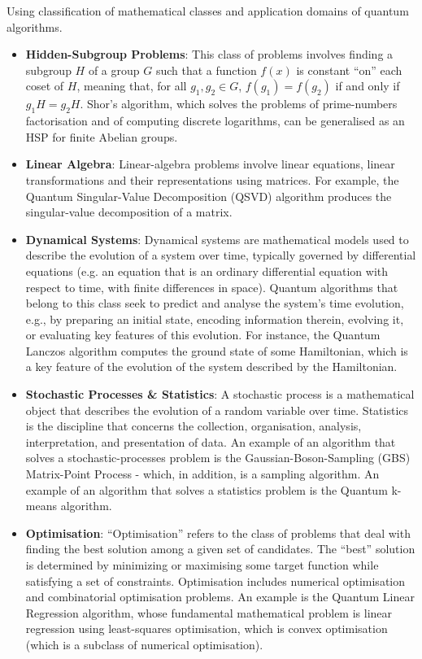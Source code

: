 Using \citeauthor{Arnault:2024} \citeyear{Arnault:2024} \cite{Arnault:2024} classification of mathematical classes
and application domains of quantum algorithms.

\begin{itemize}
\item \textbf{Hidden-Subgroup Problems}: This class of problems involves finding a subgroup $H$ of a group $G$ such
  that a function $f(x)$ is constant “on” each coset of $H$, meaning that, for all $g_1, g_2 \in G$, $f(g_1) = f(g_2)$
  if and only if $g_1H = g_2H$.
  Shor’s algorithm, which solves the problems of prime-numbers factorisation and of computing discrete logarithms,
  can be generalised as an HSP for finite Abelian groups.

\item \textbf{Linear Algebra}: Linear-algebra problems involve linear equations, linear transformations and their
  representations using matrices.
  For example, the Quantum Singular-Value Decomposition (QSVD) algorithm produces the singular-value decomposition of a matrix.

\item \textbf{Dynamical Systems}:  Dynamical systems are mathematical models used to describe the evolution of a
  system over time, typically governed by differential equations (e.g. an equation that is an ordinary differential
  equation with respect to time, with finite differences in space).
  Quantum algorithms that belong to this class seek to predict and analyse the system’s time evolution, e.g., by
  preparing an initial state, encoding information therein, evolving it, or evaluating key features of this evolution.
  For instance, the Quantum Lanczos algorithm computes the ground state of some Hamiltonian, which is a key feature of
  the evolution of the system described by the Hamiltonian.
  
\item \textbf{Stochastic Processes \& Statistics}:  A stochastic process is a mathematical object that describes the
  evolution of a random variable over time. Statistics is the discipline that concerns the collection, organisation,
  analysis, interpretation, and presentation of data.
  An example of an algorithm that solves a stochastic-processes problem is the Gaussian-Boson-Sampling (GBS)
  Matrix-Point Process - which, in addition, is a sampling algorithm. An example of an algorithm that solves a
  statistics problem is the Quantum k-means algorithm.

\item \textbf{Optimisation}: “Optimisation” refers to the class of problems that deal with finding the best solution
  among a given set of candidates. The “best” solution is determined by minimizing or maximising some target function
  while satisfying a set of constraints.
  Optimisation includes numerical optimisation and combinatorial optimisation problems. An example is the
  Quantum Linear Regression algorithm, whose fundamental mathematical problem is linear regression using least-squares
  optimisation, which is convex optimisation (which is a subclass of numerical optimisation).


\end{itemize}
